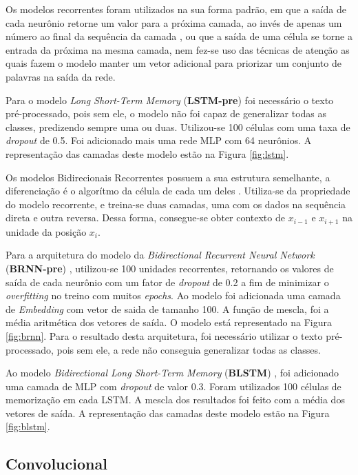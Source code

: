 Os modelos recorrentes foram utilizados na sua forma padrão, em que a saída de cada neurônio retorne um valor para a próxima camada, ao invés de apenas um número ao final da sequência da camada \cite{goldberg_neural_2017}, ou que a saída de uma célula se torne a entrada da próxima \cite{goldberg_neural_2017} na mesma camada, nem fez-se uso das técnicas de atenção \cite{goldberg_neural_2017} as quais fazem o modelo manter um vetor adicional para priorizar um conjunto de palavras na saída da rede.
 
Para o modelo \textit{Long Short-Term Memory} (\textbf{LSTM-pre}) \cite{hochreiter_long_1997} foi necessário o texto pré-processado, pois sem ele, o modelo não foi capaz de generalizar todas as classes, predizendo sempre uma ou duas. Utilizou-se 100 células com uma taxa de \textit{dropout} de 0.5. Foi adicionado mais uma rede MLP com 64 neurônios. A representação das camadas deste modelo estão na Figura \ref{fig:lstm}.

Os modelos Bidirecionais Recorrentes possuem a sua estrutura semelhante, a diferenciação é o algorítmo da célula de cada um deles \cite{graves_framewise_2005}. Utiliza-se da propriedade do modelo recorrente, e treina-se duas camadas, uma com os dados na sequência direta e outra reversa. Dessa forma, consegue-se obter contexto de $x_{i-1}$ e $x_{i+1}$ na unidade da posição $x_i$.

Para a arquitetura do modelo da \textit{Bidirectional Recurrent Neural Network} (\textbf{BRNN-pre}) \cite{schuster_bidirectional_1997},
utilizou-se 100 unidades recorrentes, retornando os valores de saída de cada
neurônio com um fator de \textit{dropout} de 0.2 a fim de minimizar o \textit{overfitting} no
treino com muitos \textit{epochs}. Ao modelo foi adicionada uma camada de \textit{Embedding} com
vetor de saida de tamanho 100. A função de mescla, foi a média aritmética dos
vetores de saída. O modelo está representado na Figura \ref{fig:brnn}. Para o
resultado desta arquitetura, foi necessário utilizar o texto pré-processado, pois
sem ele, a rede não conseguia generalizar todas as classes.

Ao modelo \textit{Bidirectional Long Short-Term Memory} (\textbf{BLSTM}) \cite{braz_document_2018}, foi adicionado uma camada de MLP com \textit{dropout} de valor 
0.3. Foram utilizados 100 células de memorização em cada LSTM. A mescla dos resultados foi feito com a média dos vetores de saída. A representação das camadas
deste modelo estão na Figura \ref{fig:blstm}.

\subsection{Convolucional}

